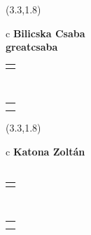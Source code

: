 \documentclass[11pt]{article}
\begin{document}
\makebox(3.3,1.8){
  \renewcommand\arraystretch{1.3}
  \begin{tabular}[c]{c}
    \hspace{8.5mm}
    \LARGE\bf{ Bilicska Csaba }\\
    \hspace{8.5mm}
    \Large{ greatcsaba }\\
    \renewcommand\arraystretch{3}
    \begin{tabular}[c]{c}
      \centering
      \fontfamily{phv}\selectfont{
        \textbf{
          \textsc{
            \scriptsize{
            \color{Bright}{ Ismerkedő }\color{Dark}{ Webmester }\color{Bright}{ Sminkmester }\color{Bright}{ Programozó }
            }
          }
        }
      }
    \end{tabular}
    \\
    \renewcommand\arraystretch{1}
    \begin{tabular}{p{3.3in}}
      \hspace{.7cm}\\
      \hspace{.7cm}\emph{  }\\
    \end{tabular}
  \end{tabular}
}

\makebox(3.3,1.8){
  \renewcommand\arraystretch{1.3}
  \begin{tabular}[c]{c}
    \hspace{8.5mm}
    \LARGE\bf{ Katona Zoltán }\\
    \hspace{8.5mm}
    \Large{  }\\
    \renewcommand\arraystretch{3}
    \begin{tabular}[c]{c}
      \centering
      \fontfamily{phv}\selectfont{
        \textbf{
          \textsc{
            \scriptsize{
            \color{Dark}{ Ismerkedő }\color{Bright}{ Webmester }\color{Bright}{ Sminkmester }\color{Bright}{ Programozó }
            }
          }
        }
      }
    \end{tabular}
    \\
    \renewcommand\arraystretch{1}
    \begin{tabular}{p{3.3in}}
      \hspace{.7cm}\\
      \hspace{.7cm}\emph{  }\\
    \end{tabular}
  \end{tabular}
}
\end{document}
